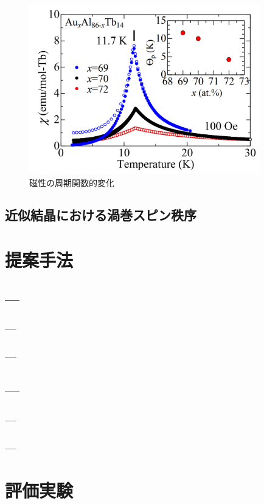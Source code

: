 \documentclass[11pt,a4j]{jreport}
\begin{document}
\begin{figure}[htbp]
  \centering
  \vspace{10mm}
  \includegraphics[width=100mm]{./figure/qi.png}
  \caption{磁性の周期関数的変化}
  \label{χ}
\end{figure}

\section{近似結晶における渦巻スピン秩序}

\chapter{提案手法}
\section{---}
\subsection{---}
\subsection{---}
\section{---}
\subsection{---}
\subsection{---}

\chapter{評価実験}
\end{document}
